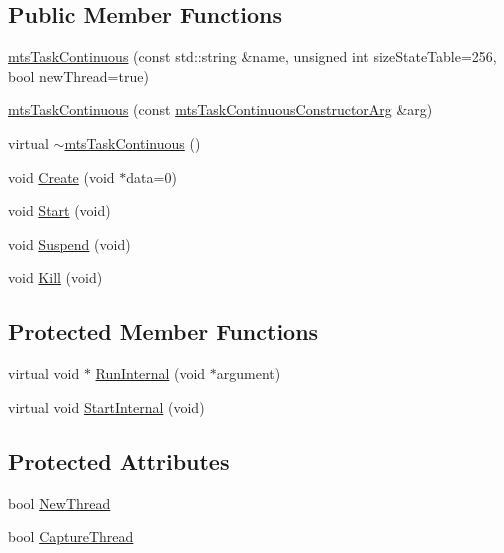 \subsection*{Public Member Functions}
\begin{DoxyCompactItemize}
\item 
\hyperlink{classmts_task_continuous_aa4b574ad6b3400d74e0986658648c787}{mts\+Task\+Continuous} (const std\+::string \&name, unsigned int size\+State\+Table=256, bool new\+Thread=true)
\item 
\hyperlink{classmts_task_continuous_a71a509719307ae6318756ecb0c2af84b}{mts\+Task\+Continuous} (const \hyperlink{classmts_task_continuous_constructor_arg}{mts\+Task\+Continuous\+Constructor\+Arg} \&arg)
\item 
virtual \hyperlink{classmts_task_continuous_a654204c18f81e298a988e89a3a524d02}{$\sim$mts\+Task\+Continuous} ()
\item 
void \hyperlink{classmts_task_continuous_a28e79bc5f1a3eb9b7ef01910dd2b55e8}{Create} (void $\ast$data=0)
\item 
void \hyperlink{classmts_task_continuous_a935299c6e0bb33bb524fee95610a40ee}{Start} (void)
\item 
void \hyperlink{classmts_task_continuous_ac227f446b1316fa938016d3190652f0d}{Suspend} (void)
\item 
void \hyperlink{classmts_task_continuous_ad1f8145306e074fbea8baab3beef4c5b}{Kill} (void)
\end{DoxyCompactItemize}
\subsection*{Protected Member Functions}
\begin{DoxyCompactItemize}
\item 
virtual void $\ast$ \hyperlink{classmts_task_continuous_ae7335e46dbed0ab3e1e44b628c438319}{Run\+Internal} (void $\ast$argument)
\item 
virtual void \hyperlink{classmts_task_continuous_ac15a9fc5d7e15c27a3677171770069c0}{Start\+Internal} (void)
\end{DoxyCompactItemize}
\subsection*{Protected Attributes}
\begin{DoxyCompactItemize}
\item 
bool \hyperlink{classmts_task_continuous_a10a9569559a59e62d28ab29c6fc7636c}{New\+Thread}
\item 
bool \hyperlink{classmts_task_continuous_ae820327812640e231d44a4b2ad6b148e}{Capture\+Thread}
\end{DoxyCompactItemize}
